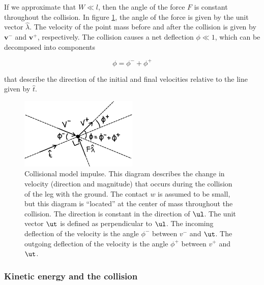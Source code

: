 If we approximate that $W \ll l$, then the angle of the force $F$ is constant throughout the collision. In figure \ref{fig:CollisionDiagram}, the angle of the force is given by the unit vector $\hat{\lambda}$. The velocity of the point mass before and after the collision is given by $\mathbf{v}^{-}$ and $\mathbf{v}^{+}$, respectively. The collision causes a net deflection $\phi \ll 1$, which can be decomposed into components

\begin{equation}
\phi = \phi^{-} + \phi^{+}
\label{eq:PhiDecompose}
\end{equation}

that describe the direction of the initial and final velocities relative to the line given by $\hat{t}$.


\begin{figure}[h]		%
\begin{centering}
\includegraphics[width=0.5\textwidth]{Figures/CollisionDiagram}\par
\end{centering}
\caption[Diagram: Collisional Model Impulse]{Collisional model impulse. This diagram describes the change in velocity (direction and magnitude) that occurs during the collision of the leg with the ground. The contact $w$ is assumed to be small, but this diagram is ``located'' at the center of mass throughout the collision. The direction is constant in the direction of $\ul$. The unit vector $\ut$ is defined as perpendicular to $\ul$. The incoming deflection of the velocity is the angle $\phi^{-}$ between $v^{-}$ and $\ut$. The outgoing deflection of the velocity is the angle $\phi^{+}$ between $v^{+}$ and $\ut$.}
\label{fig:CollisionDiagram}
\end{figure}
%

\subsubsection*{Kinetic energy and the collision}

